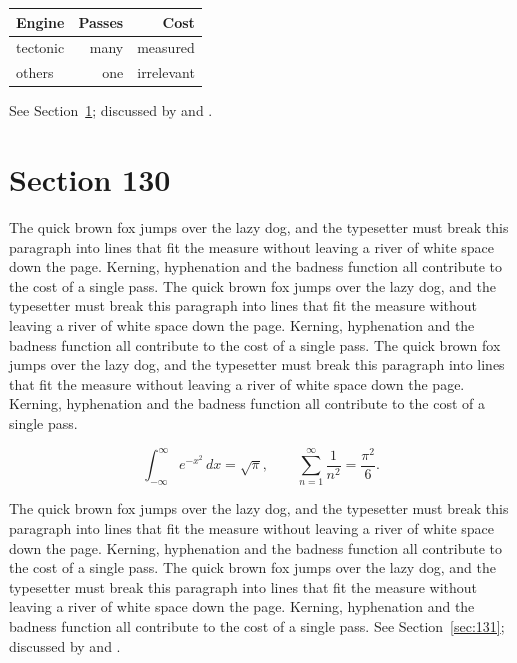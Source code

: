 \documentclass{article}
\begin{document}
\begin{center}
\begin{tabular}{lrr}
\toprule
Engine & Passes & Cost \\
\midrule
tectonic & many & measured \\
others & one & irrelevant \\
\bottomrule
\end{tabular}
\end{center}

See Section~\ref{sec:130}; discussed by \textcite{k5} and \textcite{l2}.
\section{Section 130}
\label{sec:130}
The quick brown fox jumps over the lazy dog, and the typesetter must break this paragraph into lines that fit the measure without leaving a river of white space down the page. Kerning, hyphenation and the badness function all contribute to the cost of a single pass. The quick brown fox jumps over the lazy dog, and the typesetter must break this paragraph into lines that fit the measure without leaving a river of white space down the page. Kerning, hyphenation and the badness function all contribute to the cost of a single pass. The quick brown fox jumps over the lazy dog, and the typesetter must break this paragraph into lines that fit the measure without leaving a river of white space down the page. Kerning, hyphenation and the badness function all contribute to the cost of a single pass. 

\begin{equation}\label{eq:130}
\int_{-\infty}^{\infty} e^{-x^{2}}\,dx = \sqrt{\pi}, \qquad
\sum_{n=1}^{\infty} \frac{1}{n^{2}} = \frac{\pi^{2}}{6}.
\end{equation}

The quick brown fox jumps over the lazy dog, and the typesetter must break this paragraph into lines that fit the measure without leaving a river of white space down the page. Kerning, hyphenation and the badness function all contribute to the cost of a single pass. The quick brown fox jumps over the lazy dog, and the typesetter must break this paragraph into lines that fit the measure without leaving a river of white space down the page. Kerning, hyphenation and the badness function all contribute to the cost of a single pass. 
See Section~\ref{sec:131}; discussed by \textcite{k1} and \textcite{l3}.
\end{document}
